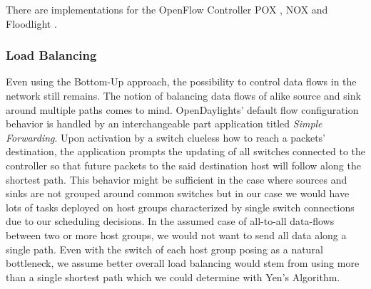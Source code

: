 There are implementations for the OpenFlow Controller POX \cite{opennetmon}, NOX \cite{opentm} and
Floodlight \cite {flowsense}.

\subsubsection{Load Balancing}
Even using the Bottom-Up approach, the possibility to control data flows in the network still
remains. The notion of balancing data flows of alike source and sink around multiple paths comes to
mind. OpenDaylights' default flow configuration behavior is handled by an interchangeable part
application titled \textit{Simple Forwarding}. Upon activation by a switch clueless how to reach a
packets' destination, the application prompts the updating of all switches connected to the
controller so that future packets to the said destination host will follow along the shortest path.
This behavior might be sufficient in the case where sources and sinks are not grouped around common
switches but in our case we would have lots of tasks deployed on host groups characterized by single
switch connections due to our scheduling decisions. In the assumed case of all-to-all data-flows
between two or more host groups, we would not want to send all data along a single path. Even with
the switch of each host group posing as a natural bottleneck, we assume better overall load
balancing would stem from using more than a single shortest path which we could determine with Yen's
Algorithm.

